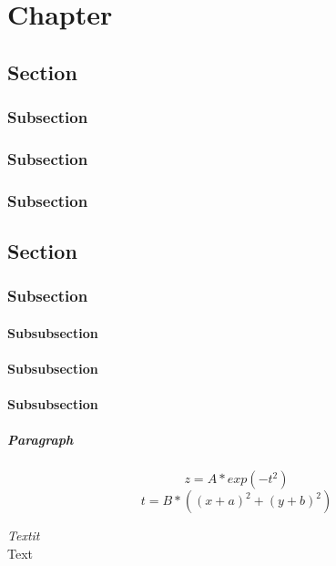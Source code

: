\documentclass[a4paper]{report}
\begin{document}
\chapter{Chapter}
\section{Section}
\subsection{Subsection}
\subsection{Subsection}
\subsection{Subsection}

\section{Section}
\subsection{Subsection}
\subsubsection{Subsubsection}
\subsubsection{Subsubsection}
\subsubsection{Subsubsection}

\paragraph{Paragraph}

	\begin{equation}
		z = A*exp(-t^2)
	\end{equation}
	\begin{equation}
		t = B*((x+a)^2 + (y+b)^2)
	\end{equation}


	\textit{Textit}\\
	Text \\
\end{document}

